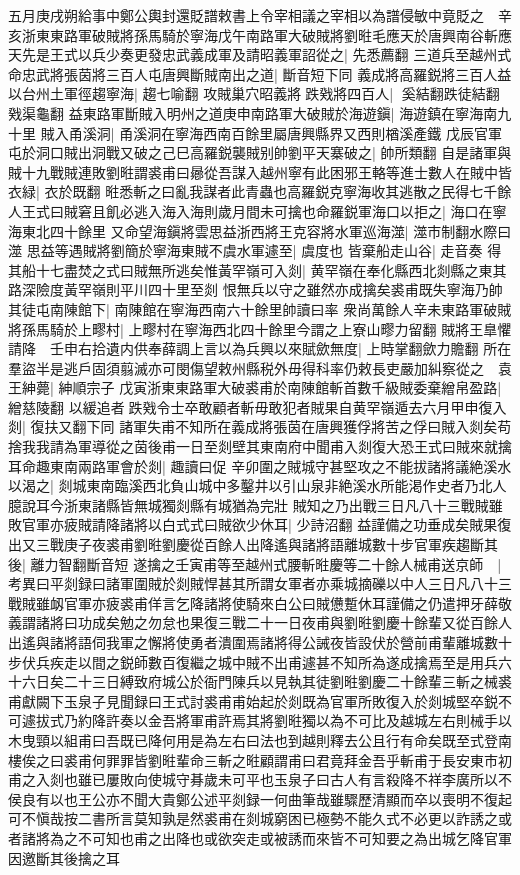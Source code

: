 五月庚戌朔給事中鄭公輿封還貶譜敕書上令宰相議之宰相以為譜侵敏中竟貶之　辛亥浙東東路軍破賊將孫馬騎於寧海戊午南路軍大破賊將劉暀毛應天於唐興南谷斬應天先是王式以兵少奏更發忠武義成軍及請昭義軍詔從之|{
	先悉薦翻}
三道兵至越州式命忠武將張茵將三百人屯唐興斷賊南出之道|{
	斷音短下同}
義成將高羅鋭將三百人益以台州土軍徑趨寧海|{
	趨七喻翻}
攻賊巢穴昭義將跌戣將四百人|{
	奚結翻跌徒結翻戣渠龜翻}
益東路軍斷賊入明州之道庚申南路軍大破賊於海遊鎭|{
	海遊鎮在寧海南九十里}
賊入甬溪洞|{
	甬溪洞在寧海西南百餘里屬唐興縣界又西則楢溪產鐵}
戊辰官軍屯於洞口賊出洞戰又破之己巳高羅鋭襲賊别帥劉平天寨破之|{
	帥所類翻}
自是諸軍與賊十九戰賊連敗劉暀謂裘甫曰曏從吾謀入越州寧有此困邪王輅等進士數人在賊中皆衣緑|{
	衣於既翻}
暀悉斬之曰亂我謀者此青蟲也高羅鋭克寧海收其逃散之民得七千餘人王式曰賊窘且飢必逃入海入海則歲月間未可擒也命羅鋭軍海口以拒之|{
	海口在寧海東北四十餘里}
又命望海鎭將雲思益浙西將王克容將水軍巡海澨|{
	澨市制翻水際曰澨}
思益等遇賊將劉簡於寧海東賊不虞水軍遽至|{
	虞度也}
皆棄船走山谷|{
	走音奏}
得其船十七盡焚之式曰賊無所逃矣惟黃罕嶺可入剡|{
	黄罕嶺在奉化縣西北剡縣之東其路深險度黃罕嶺則平川四十里至剡}
恨無兵以守之雖然亦成擒矣裘甫既失寧海乃帥其徒屯南陳館下|{
	南陳館在寧海西南六十餘里帥讀曰率}
衆尚萬餘人辛未東路軍破賊將孫馬騎於上疁村|{
	上疁村在寧海西北四十餘里今謂之上寮山疁力留翻}
賊將王臯懼請降　壬申右拾遺内供奉薛調上言以為兵興以來賦歛無度|{
	上時掌翻歛力贍翻}
所在羣盜半是逃戶固須翦滅亦可閔傷望敕州縣税外毋得科率仍敕長吏嚴加糾察從之　袁王紳薨|{
	紳順宗子}
戊寅浙東東路軍大破裘甫於南陳館斬首數千級賊委棄繒帛盈路|{
	繒慈陵翻}
以緩追者跌戣令士卒敢顧者斬毋敢犯者賊果自黄罕嶺遁去六月甲申復入剡|{
	復扶又翻下同}
諸軍失甫不知所在義成將張茵在唐興獲俘將苦之俘曰賊入剡矣苟捨我我請為軍導從之茵後甫一日至剡壁其東南府中聞甫入剡復大恐王式曰賊來就擒耳命趣東南兩路軍會於剡|{
	趣讀曰促}
辛卯圍之賊城守甚堅攻之不能拔諸將議絶溪水以渴之|{
	剡城東南臨溪西北負山城中多鑿井以引山泉非絶溪水所能渇作史者乃北人臆說耳今浙東諸縣皆無城獨剡縣有城猶為完壯}
賊知之乃出戰三日凡八十三戰賊雖敗官軍亦疲賊請降諸將以白式式曰賊欲少休耳|{
	少詩沼翻}
益謹備之功垂成矣賊果復出又三戰庚子夜裘甫劉暀劉慶從百餘人出降遙與諸將語離城數十步官軍疾趨斷其後|{
	離力智翻斷音短}
遂擒之壬寅甫等至越州式腰斬暀慶等二十餘人械甫送京師　|{
	考異曰平剡録曰諸軍圍賊於剡賊悍甚其所謂女軍者亦乘城摘礫以中人三日凡八十三戰賊雖衂官軍亦疲裘甫佯言乞降諸將使騎來白公曰賊憊蹔休耳謹備之仍遣押牙薛敬義謂諸將曰功成矣勉之勿怠也果復三戰二十一日夜甫與劉暀劉慶十餘輩又從百餘人出遙與諸將語伺我軍之懈將使勇者潰圍焉諸將得公誡夜皆設伏於營前甫輩離城數十步伏兵疾走以間之鋭師數百復繼之城中賊不出甫遽甚不知所為遂成擒焉至是用兵六十六日矣二十三日縛致府城公於衙門陳兵以見執其徒劉暀劉慶二十餘輩三斬之械裘甫獻闕下玉泉子見聞録曰王式討裘甫甫始起於剡既為官軍所敗復入於剡城堅卒鋭不可遽拔式乃約降許奏以金吾將軍甫許焉其將劉暀獨以為不可比及越城左右則械手以木曳頸以組甫曰吾既已降何用是為左右曰法也到越則釋去公且行有命矣既至式登南樓俟之曰裘甫何罪罪皆劉暀輩命三斬之暀顧謂甫曰君竟拜金吾乎斬甫于長安東市初甫之入剡也雖已屢敗向使城守朞歲未可平也玉泉子曰古人有言殺降不祥李廣所以不侯良有以也王公亦不聞大貴鄭公述平剡録一何曲筆哉雖驟歷清顯而卒以喪明不復起可不愼哉按二書所言莫知孰是然裘甫在剡城窮困已極勢不能久式不必更以詐誘之或者諸將為之不可知也甫之出降也或欲突走或被誘而來皆不可知要之為出城乞降官軍因邀斷其後擒之耳}
